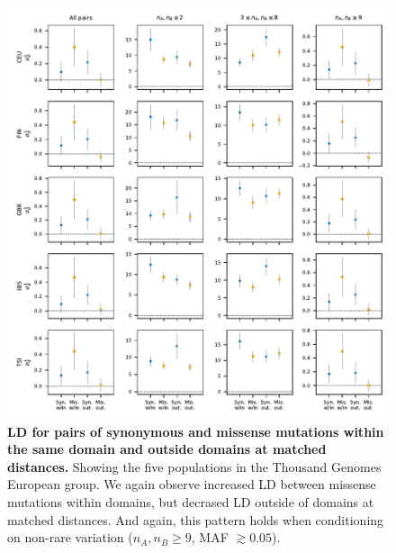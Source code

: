 \documentclass[]{article}
\begin{document}
\begin{figure}[ht!]
    \centering
    \includegraphics{../figures/data_domains_eur}
    \caption{
        \textbf{LD for pairs of synonymous and missense mutations within the
        same domain and outside domains at matched distances.}
        Showing the five populations in the Thousand Genomes European group.
        We again observe increased LD between missense mutations within domains,
        but decrased LD outside of domains at matched distances. And again,
        this pattern holds when conditioning on non-rare variation
        (\(n_A, n_B \geq 9\), MAF \(\gtrsim 0.05\)).
    }
    \label{fig:domainsEUR}
\end{figure}
\end{document}
